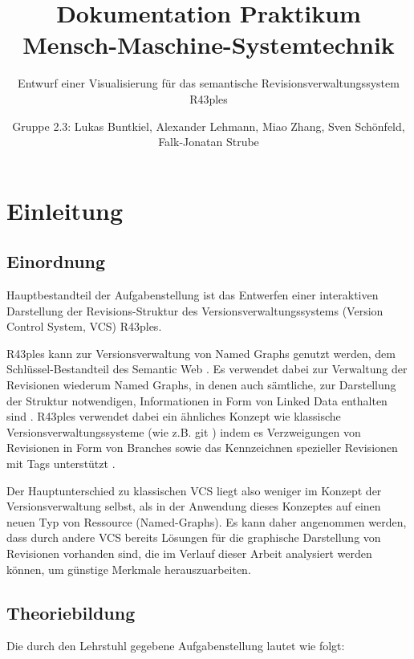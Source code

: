 \documentclass[color, ddc]{tudscrreprt}
\begin{document}
    \title{Dokumentation Praktikum Mensch-Maschine-Systemtechnik}
    \subtitle{Entwurf einer Visualisierung für das
semantische Revisionsverwaltungssystem R43ples}
    \author{Gruppe 2.3:
    Lukas Buntkiel, 
    Alexander Lehmann, 
    Miao Zhang, 
    Sven Schönfeld,
    Falk-Jonatan Strube}
    \maketitle

\tableofcontents

\chapter{Einleitung}

\section{Einordnung}

Hauptbestandteil der Aufgabenstellung ist das Entwerfen einer interaktiven Darstellung der Revisions-Struktur des Versionsverwaltungssystems (Version Control System, VCS) R43ples.

R43ples kann zur Versionsverwaltung von Named Graphs genutzt werden, dem Schlüs\-sel-Be\-stand\-teil des Semantic Web \cite{pascal:semanic-web}. Es verwendet dabei zur Verwaltung der Revisionen wiederum Named Graphs, in denen auch sämtliche, zur Darstellung der Struktur notwendigen, Informationen in Form von Linked Data enthalten sind \cite{graube:r43ples}. R43ples verwendet dabei ein ähnliches Konzept wie klassische Versionsverwaltungssysteme (wie z.B. git \cite{url:git-scm}) indem es Verzweigungen von Revisionen in Form von Branches sowie das Kennzeichnen spezieller Revisionen mit Tags unterstützt \cite{graube:r43ples}.

Der Hauptunterschied zu klassischen VCS liegt also weniger im Konzept der Versionsverwaltung selbst, als in der Anwendung dieses Konzeptes auf einen neuen Typ von Ressource (Named-Graphs). Es kann daher angenommen werden, dass durch andere VCS bereits Lösungen für die graphische Darstellung von Revisionen vorhanden sind, die im Verlauf dieser Arbeit analysiert werden können, um günstige Merkmale herauszuarbeiten.

\section{Theoriebildung}

Die durch den Lehrstuhl gegebene Aufgabenstellung lautet wie folgt:
\end{document}
